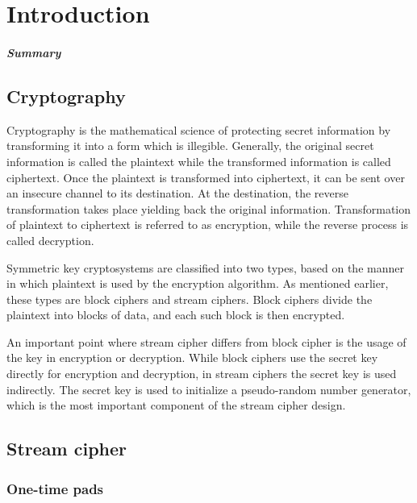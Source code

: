 \chapter{Introduction}
\label{chapter:intro}

\paragraph{Summary}


\section{Cryptography}

Cryptography is the mathematical science of protecting secret information by transforming it into a form which is illegible. Generally, the original secret information is called the plaintext while the transformed information is called ciphertext. Once the plaintext is transformed into ciphertext, it can be sent over an insecure channel to its destination. At the destination, the reverse transformation takes place yielding back the original information. Transformation of plaintext to ciphertext is referred to as encryption, while the reverse process is called decryption.


Symmetric key cryptosystems are classified into two types, based on the manner in which plaintext is used by the encryption algorithm. As mentioned earlier, these types are block ciphers and stream ciphers. Block ciphers divide the plaintext into blocks of data, and each such block is then encrypted. 



An important point where stream cipher differs from block cipher is the usage of the key in encryption or decryption. While block ciphers use the secret key directly for encryption and decryption, in stream ciphers the secret key is used indirectly. The secret key is used to initialize a pseudo-random number generator, which is the most important component of the stream cipher design. 



\section{Stream cipher}

\subsection{One-time pads} 

